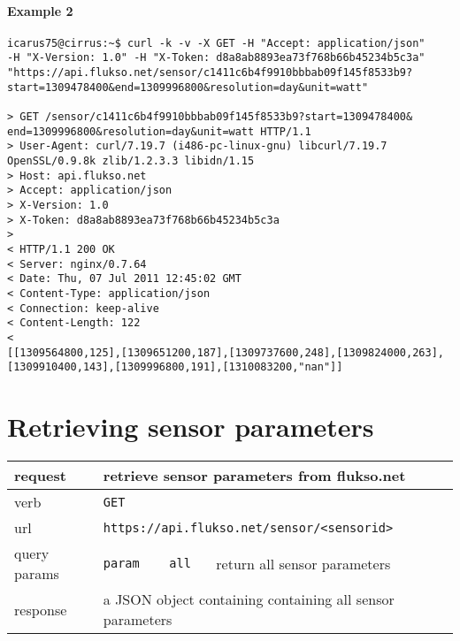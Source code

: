 \paragraph{Example 2}
\begin{Verbatim}
icarus75@cirrus:~$ curl -k -v -X GET -H "Accept: application/json"
-H "X-Version: 1.0" -H "X-Token: d8a8ab8893ea73f768b66b45234b5c3a"
"https://api.flukso.net/sensor/c1411c6b4f9910bbbab09f145f8533b9?
start=1309478400&end=1309996800&resolution=day&unit=watt"

> GET /sensor/c1411c6b4f9910bbbab09f145f8533b9?start=1309478400&
end=1309996800&resolution=day&unit=watt HTTP/1.1
> User-Agent: curl/7.19.7 (i486-pc-linux-gnu) libcurl/7.19.7
OpenSSL/0.9.8k zlib/1.2.3.3 libidn/1.15
> Host: api.flukso.net
> Accept: application/json
> X-Version: 1.0
> X-Token: d8a8ab8893ea73f768b66b45234b5c3a
> 
< HTTP/1.1 200 OK
< Server: nginx/0.7.64
< Date: Thu, 07 Jul 2011 12:45:02 GMT
< Content-Type: application/json
< Connection: keep-alive
< Content-Length: 122
< 
[[1309564800,125],[1309651200,187],[1309737600,248],[1309824000,263],
[1309910400,143],[1309996800,191],[1310083200,"nan"]]
\end{Verbatim}

\section{Retrieving sensor parameters}
\begin{tabular}{|l|l|l|p{5cm}|}

\hline
request & \multicolumn{3}{|l|}{retrieve sensor parameters from flukso.net} \\

\hline
verb & \multicolumn{3}{|l|}{\texttt{GET}} \\

\hline
url & \multicolumn{3}{|l|}{\texttt{https://api.flukso.net/sensor/\textless sensorid\textgreater}} \\

\hline
{query params} & \texttt{param} & \texttt{all} & return all sensor parameters \\

\hline
response & \multicolumn{3}{|l|}{a JSON object containing containing all sensor parameters} \\

\hline

\end{tabular}


